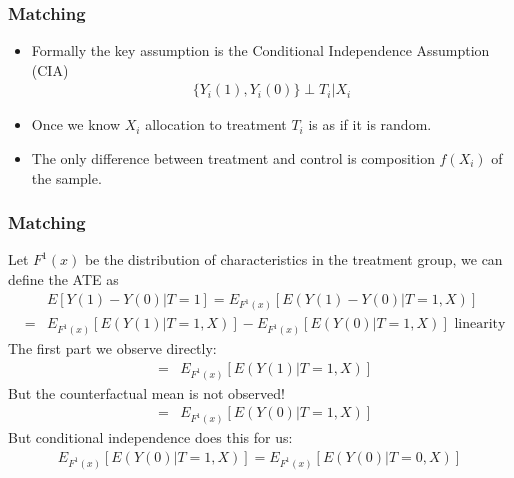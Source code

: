 \documentclass[xcolor=pdftex,dvipsnames,table,mathserif,aspectratio=169]{beamer}
\begin{document}
\begin{frame}
\frametitle{Matching}
\begin{itemize}
\item Formally the key assumption is the \alert{Conditional Independence Assumption (CIA)}
\begin{eqnarray*}
\{Y_i(1),Y_i(0)\}  \perp T_i | X_i
\end{eqnarray*}
\item Once we know $X_i$ allocation to treatment $T_i$ is as if it is random.
\item The only difference between treatment and control is composition $f(X_i)$ of the sample.
\end{itemize}
\end{frame}




\begin{frame}
\frametitle{Matching}
\small
Let  $F^{1}(x)$ be the distribution of characteristics in the treatment group, we can define the ATE as 
\begin{eqnarray*}
&&E[Y(1) - Y(0) | T =1] = E_{F^1(x)} [E(Y(1) -Y(0) | T=1,X)] \\
&=&  E_{F^1(x)} [E(Y(1) | T=1,X)] -  E_{F^1(x)} [E(Y(0) | T=1,X)] \mbox{ linearity } 
\end{eqnarray*}
The first part we observe directly:
\begin{eqnarray*}
&=&  E_{F^1(x)} [E(Y(1) | T=1,X)] 
\end{eqnarray*}
But the counterfactual mean is not observed!
\begin{eqnarray*}
&=&  E_{F^1(x)} [E(Y(0) | T=1,X)] 
\end{eqnarray*}
But conditional independence does this for us:
\begin{eqnarray*}
 E_{F^1(x)} [E(Y(0) | T=1,X)]  =  E_{F^1(x)} [E(Y(0) | T=0,X)] 
\end{eqnarray*}
\end{frame}
\end{document}

